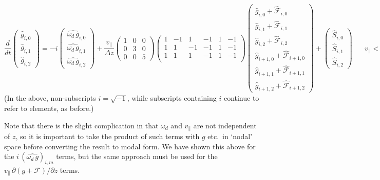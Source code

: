 \documentclass[10pt,a4paper]{article}
\newcommand{\dd}{\partial}
\begin{document}
\begin{equation} \boxed{
\frac{d}{dt} \left( \begin{array}{c}
\hat{g}_{i,0} \\ \hat{g}_{i,1} \\ \hat{g}_{i,2}
\end{array} \right)
=
-i \left( \begin{array}{c}
\widehat{\omega_d\,g}_{i,0} \\ \widehat{\omega_d\,g}_{i,1} \\ \widehat{\omega_d\,g}_{i,2}
\end{array} \right)
+ \frac{v_\parallel}{\Delta z} \left(
\begin{array}{ccc}
1 & 0 & 0 \\
0 & 3 & 0 \\
0 & 0 & 5
\end{array} \right)
\left(
\begin{array}{rrrrrr}
1 & -1 & 1 & -1 & 1 & -1 \\
1 & 1 & -1 & -1 & 1 & -1 \\
1 & 1 & 1 & -1 & 1 & -1 \\
\end{array} \right)
\left( \begin{array}{c}
\hat{g}_{i,0} + \hat{\mathcal{F}}_{i,0} \\
\hat{g}_{i,1} + \hat{\mathcal{F}}_{i,1} \\
\hat{g}_{i,2} + \hat{\mathcal{F}}_{i,2} \\
\hat{g}_{i+1,0} + \hat{\mathcal{F}}_{i+1,0} \\
\hat{g}_{i+1,1} + \hat{\mathcal{F}}_{i+1,1} \\
\hat{g}_{i+1,2} + \hat{\mathcal{F}}_{i+1,2}
\end{array} \right)
+ \left( \begin{array}{c}
\hat{S}_{i,0} \\ \hat{S}_{i,1} \\ \hat{S}_{i,2}
\end{array} \right)
} \;\;\;\;\;\; v_\parallel < 0
\label{eqn:vminus}
\end{equation} 
\normalsize
(In the above, non-subscripts $i = \sqrt{-1}$, while subscripts containing $i$
continue to refer to elements, as before.)

Note that there is the slight complication in that $\omega_d$ and
$v_\parallel$ are not independent of $z$, so it is important to take the
product of such terms with $g$ etc.\ in `nodal' space before converting the
result to modal form.  We have shown this above for the $i \,
(\widehat{\omega_d \, g})_{i,m}$ terms, but the same approach must be used for
the $v_\parallel \, \dd(g+\mathcal{F})/\dd z$ terms.
\end{document}
